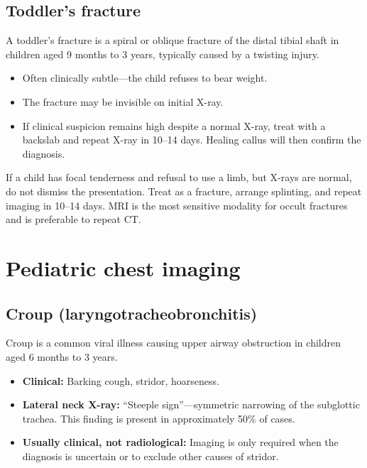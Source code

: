 \subsection{Toddler's fracture}
A toddler's fracture is a spiral or oblique fracture of the distal tibial shaft in children aged 9 months to 3 years, typically caused by a twisting injury.
\begin{itemize}
    \item Often clinically subtle---the child refuses to bear weight.
    \item The fracture may be invisible on initial X-ray.
    \item If clinical suspicion remains high despite a normal X-ray, treat with a backslab and repeat X-ray in 10--14 days. Healing callus will then confirm the diagnosis.
\end{itemize}

\begin{pearlbox}
If a child has focal tenderness and refusal to use a limb, but X-rays are normal, do not dismiss the presentation. Treat as a fracture, arrange splinting, and repeat imaging in 10--14 days. MRI is the most sensitive modality for occult fractures and is preferable to repeat CT.
\end{pearlbox}

\section{Pediatric chest imaging}

\subsection{Croup (laryngotracheobronchitis)}
Croup is a common viral illness causing upper airway obstruction in children aged 6 months to 3 years.
\begin{itemize}
    \item \textbf{Clinical:} Barking cough, stridor, hoarseness.
    \item \textbf{Lateral neck X-ray:} ``Steeple sign''---symmetric narrowing of the subglottic trachea. This finding is present in approximately 50\% of cases.
    \item \textbf{Usually clinical, not radiological:} Imaging is only required when the diagnosis is uncertain or to exclude other causes of stridor.
\end{itemize}

